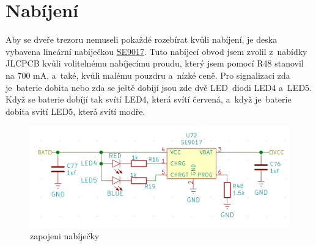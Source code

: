 \section{Nabíjení}

Aby se dveře trezoru nemuseli pokaždé rozebírat kvůli nabíjení, je deska vybavena lineární nabíječkou 
\href{https://datasheet.lcsc.com/szlcsc/Seaward-Elec-SE9017-HF_C115752.pdf}{SE9017}. 
Tuto nabíjecí obvod jsem zvolil z~nabídky JLCPCB kvůli volitelnému nabíjecímu proudu, který jsem pomocí R48 stanovil na 700 mA, a~také, kvůli malému 
pouzdru a~nízké ceně.
Pro signalizaci zda je~baterie dobita nebo zda se ještě dobijí jsou zde dvě LED~diodi LED4 a~LED5. Když se baterie dobíjí tak svítí LED4, která svítí 
červená, a~když je~baterie dobita svítí LED5, která svítí modře.

\begin{figure}[htbp]
    \centering
    \includegraphics[width=\textwidth]{kapitoly/obrazky/E4/nabijeni/nabijecka.png}
    \caption{zapojeni nabíječky}
    \label{fig:E4-step-up}
\end{figure}

\newpage
